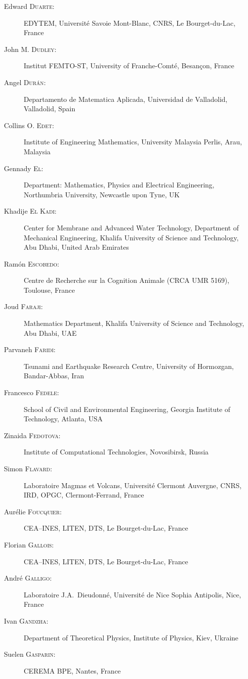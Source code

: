 \documentclass[final, a4paper, oneside, 12pt]{article}
\numberwithin{equation}{section}
\begin{document}
\begin{description}
  \item[Edward \textsc{Duarte}:] EDYTEM, Universit\'e Savoie Mont-Blanc, CNRS, Le Bourget-du-Lac, France
  \item[John M. \textsc{Dudley}:] Institut FEMTO-ST, University of Franche-Comt\'e, Besan\c{c}on, France
  \item[Angel \textsc{Dur\'an}:] Departamento de Matematica Aplicada, Universidad de Valladolid, Valladolid, Spain
  \item[Collins O. \textsc{Edet}:] Institute of Engineering Mathematics, University Malaysia Perlis, Arau, Malaysia
  \item[Gennady \textsc{El}:] Department: Mathematics, Physics and Electrical Engineering, Northumbria University, Newcastle upon Tyne, UK
  \item[Khadije \textsc{El Kadi}:] Center for Membrane and Advanced Water Technology, Department of Mechanical Engineering, Khalifa University of Science and Technology, Abu Dhabi, United Arab Emirates
  \item[Ram\'on \textsc{Escobedo}:] Centre de Recherche sur la Cognition Animale (CRCA UMR 5169), Toulouse, France
  \item[Joud \textsc{Faraji}:] Mathematics Department, Khalifa University of Science and Technology, Abu Dhabi, UAE
  \item[Parvaneh \textsc{Faridi}:] Tsunami and Earthquake Research Centre, University of Hormozgan, Bandar-Abbas, Iran
  \item[Francesco \textsc{Fedele}:] School of Civil and Environmental Engineering, Georgia Institute of Technology, Atlanta, USA
  \item[Zinaida \textsc{Fedotova}:] Institute of Computational Technologies, Novosibirsk, Russia
  \item[Simon \textsc{Flavard}:] Laboratoire Magmas et Volcans, Universit\'e Clermont Auvergne, CNRS, IRD, OPGC, Clermont-Ferrand, France
  \item[Aur\'elie \textsc{Foucquier}:] CEA--INES, LITEN, DTS, Le Bourget-du-Lac, France
  \item[Florian \textsc{Gallois}:] CEA--INES, LITEN, DTS, Le Bourget-du-Lac, France
  \item[Andr\'e \textsc{Galligo}:] Laboratoire J.A.~Dieudonn\'e, Universit\'e de Nice Sophia Antipolis, Nice, France
  \item[Ivan \textsc{Gandzha}:] Department of Theoretical Physics, Institute of Physics, Kiev, Ukraine
  \item[Suelen \textsc{Gasparin}:] CEREMA BPE, Nantes, France

\end{description}
\end{document}
